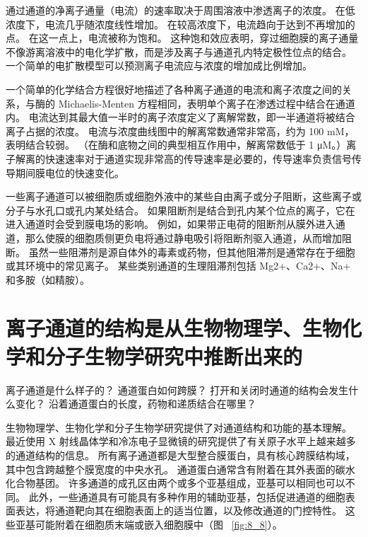 通过通道的净离子通量（电流）的速率取决于周围溶液中渗透离子的浓度。
在低浓度下，电流几乎随浓度线性增加。
在较高浓度下，电流趋向于达到不再增加的点。
在这一点上，电流被称为饱和。
这种饱和效应表明，穿过细胞膜的离子通量不像游离溶液中的电化学扩散，而是涉及离子与通道孔内特定极性位点的结合。
一个简单的电扩散模型可以预测离子电流应与浓度的增加成比例增加。


一个简单的化学结合方程很好地描述了各种离子通道的电流和离子浓度之间的关系，与酶的 Michaelis-Menten 方程相同，表明单个离子在渗透过程中结合在通道内。
电流达到其最大值一半时的离子浓度定义了离解常数，即一半通道将被结合离子占据的浓度。
电流与浓度曲线图中的解离常数通常非常高，约为 100 mM，表明结合较弱。 （在酶和底物之间的典型相互作用中，解离常数低于 1 μM。）离子解离的快速速率对于通道实现非常高的传导速率是必要的，传导速率负责信号传导期间膜电位的快速变化。


一些离子通道可以被细胞质或细胞外液中的某些自由离子或分子阻断，这些离子或分子与水孔口或孔内某处结合。 如果阻断剂是结合到孔内某个位点的离子，它在进入通道时会受到膜电场的影响。
例如，如果带正电荷的阻断剂从膜外进入通道，那么使膜的细胞质侧更负电将通过静电吸引将阻断剂驱入通道，从而增加阻断。
虽然一些阻滞剂是源自体外的毒素或药物，但其他阻滞剂是通常存在于细胞或其环境中的常见离子。
某些类别通道的生理阻滞剂包括 Mg2+、Ca2+、Na+ 和多胺（如精胺）。



\section{离子通道的结构是从生物物理学、生物化学和分子生物学研究中推断出来的}

离子通道是什么样子的？
通道蛋白如何跨膜？
打开和关闭时通道的结构会发生什么变化？
沿着通道蛋白的长度，药物和递质结合在哪里？


生物物理学、生物化学和分子生物学研究提供了对通道结构和功能的基本理解。
最近使用 X 射线晶体学和冷冻电子显微镜的研究提供了有关原子水平上越来越多的通道结构的信息。
所有离子通道都是大型整合膜蛋白，具有核心跨膜结构域，其中包含跨越整个膜宽度的中央水孔。
通道蛋白通常含有附着在其外表面的碳水化合物基团。 许多通道的成孔区由两个或多个亚基组成，亚基可以相同也可以不同。
此外，一些通道具有可能具有多种作用的辅助亚基，包括促进通道的细胞表面表达，将通道靶向其在细胞表面上的适当位置，以及修改通道的门控特性。
这些亚基可能附着在细胞质末端或嵌入细胞膜中（图 ~\ref{fig:8_8}）。


